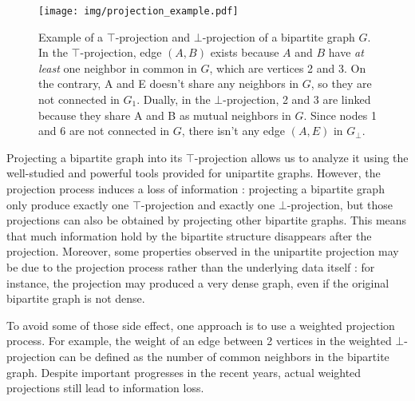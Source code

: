 \documentclass[table]{report}
\begin{document}

\begin{figure}[h]%
\centering
\texttt{[image: img/projection\_example.pdf]}
\caption{Example of a $\top$-projection and $\bot$-projection of a bipartite graph $G$. In the $\top$-projection, edge $(A,B)$ exists because $A$ and $B$ have \textit{at least} one neighbor in common in $G$, which are vertices 2 and 3. On the contrary, A and E doesn't share any neighbors in $G$, so they are not connected in $G_{1}$. Dually, in the $\bot$-projection, 2 and 3 are linked because they share A and B as mutual neighbors in $G$. Since nodes 1 and 6 are not connected in $G$, there isn't any edge $(A,E)$ in $G_{\bot}$.}
\label{fig:projection_example}
\end{figure}
\FloatBarrier



Projecting a bipartite graph into its $\top$-projection allows us to analyze it using the well-studied and powerful tools provided for unipartite graphs.  However, the projection process induces a loss of information : projecting a bipartite graph only produce exactly one $\top$-projection and exactly one $\bot$-projection, but those projections can also be obtained by projecting other bipartite graphs. This means that much information hold by the bipartite structure disappears after the projection. Moreover, some properties observed in the unipartite projection may be due to the projection process rather than the underlying data itself : for instance, the projection may produced a very dense graph, even if the original bipartite graph is not dense.

To avoid some of those side effect, one approach is to use a weighted projection process. For example, the weight of an edge between 2 vertices in the weighted $\bot$-projection can be defined as the number of common neighbors in the bipartite graph. 
Despite important progresses in the recent years, actual weighted projections still lead to information loss.
\end{document}
